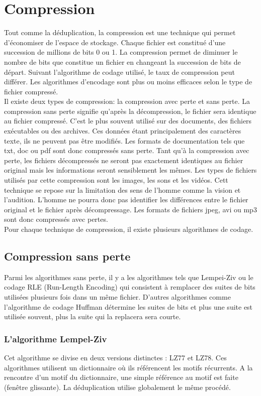 \documentclass[a4paper]{report}
\begin{document}
	\chapter*{Compression}
	Tout comme la déduplication, la compression est une technique qui permet d'économiser de l'espace de stockage. Chaque fichier est constitué d'une succession de millions de bits 0 ou 1. La compression permet de diminuer le nombre de bits que constitue un fichier en changeant la succession de bits de départ. Suivant l'algorithme de codage utilisé, le taux de compression peut différer. Les algorithmes d'encodage sont plus ou moins efficaces selon le type de fichier compressé.\\
 Il existe deux types de compression: la compression avec perte et sans perte. La compression sans perte signifie qu'après la décompression, le fichier sera identique au fichier compressé. C'est le plus souvent utilisé sur des documents, des fichiers exécutables ou des archives. Ces données étant principalement des caractères texte, ils ne peuvent pas être modifiés. Les formats de documentation tels que txt, doc ou pdf sont donc compressés sans perte.  Tant qu'à la compression avec perte, les fichiers décompressés ne seront pas exactement identiques au fichier original mais les informations seront sensiblement les mêmes. Les types de fichiers utilisés par cette compression sont les images, les sons et les vidéos. Cett technique se repose sur la limitation des sens de l'homme comme la vision et l'audition. L'homme ne pourra donc pas identifier les différences entre le fichier original et le fichier après décompressage. Les formats de fichiers jpeg, avi ou mp3 sont donc compressés avec pertes. \\
Pour chaque technique de compression, il existe plusieurs algorithmes de codage.\\
	\section{Compression sans perte}
	Parmi les algorithmes sans perte, il y a les algorithmes tels que Lempei-Ziv ou le codage RLE (Run-Length Encoding) qui consistent à remplacer des suites de bits utilisées plusieurs fois dans un même fichier. D'autres algorithmes comme l'algorithme de codage Huffman détermine les suites de bits et plus une suite est utilisée souvent, plus la suite qui la replacera sera courte.
	\subsection{L'algorithme Lempel-Ziv}
		Cet algorithme se divise en deux versions distinctes : LZ77 et LZ78. Ces algorithmes utilisent un dictionnaire où ils référencent les motifs récurrents. A la rencontre d'un motif du dictionnaire, une simple référence au motif est faite (fenêtre glissante). La déduplication utilise globalement le même procédé.\\
\end{document}
